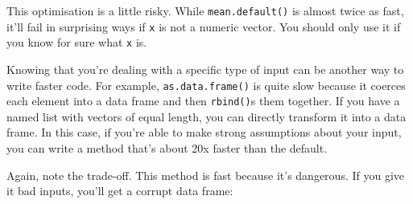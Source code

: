 This optimisation is a little risky. While \texttt{mean.default()} is
almost twice as fast, it'll fail in surprising ways if \texttt{x} is not
a numeric vector. You should only use it if you know for sure what
\texttt{x} is.

Knowing that you're dealing with a specific type of input can be another
way to write faster code. For example, \texttt{as.data.frame()} is quite
slow because it coerces each element into a data frame and then
\texttt{rbind()}s them together. If you have a named list with vectors
of equal length, you can directly transform it into a data frame. In
this case, if you're able to make strong assumptions about your input,
you can write a method that's about 20x faster than the default.

\begin{Shaded}
\begin{Highlighting}[]
\StringTok{ }
  \NormalTok{) <-}\StringTok{ }\NormalTok{(}\NormalTok{(l[[}\NormalTok{]]))}
\NormalTok{\}}

\StringTok{ }\NormalTok{(}\NormalTok{:}\NormalTok{(}\NormalTok{))}
\StringTok{ }

\NormalTok{(}
   
   
\NormalTok{)}
\end{Highlighting}
\end{Shaded}

Again, note the trade-off. This method is fast because it's dangerous.
If you give it bad inputs, you'll get a corrupt data frame:

\begin{Shaded}
\begin{Highlighting}[]
\NormalTok{(}\NormalTok{(} \NormalTok{, } \NormalTok{:}\NormalTok{))}
\end{Highlighting}
\end{Shaded}

